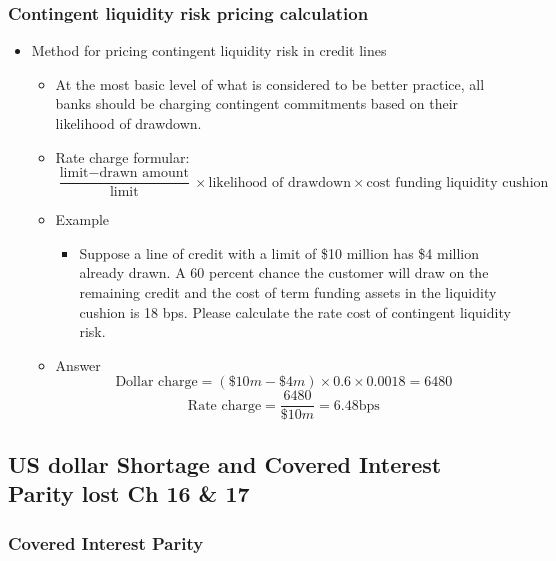 \subsubsection{Contingent liquidity risk pricing calculation}
\begin{itemize}
\item Method for pricing contingent liquidity risk in credit lines
    \begin{itemize}
    \item At the most basic level of what is considered to be better practice, all banks should be charging contingent commitments based on their likelihood of drawdown.
    \item Rate charge formular:
    \[
\frac{\text{limit} - \text{drawn amount}}{\text{limit}} \times \text{likelihood of drawdown} \times \text{cost funding liquidity cushion}
\]

    \item Example
        \begin{itemize}
        \item Suppose a line of credit with a limit of \$10 million has \$4 million already drawn. A 60 percent chance the customer will draw on the remaining credit and the cost of term funding assets in the liquidity cushion is 18 bps. Please calculate the rate cost of contingent liquidity risk.
        \end{itemize}
    \item Answer
        \[
\text{Dollar charge} = (\$10m - \$4m) \times 0.6 \times 0.0018 = 6480
\]
\[
\text{Rate charge} = \frac{6480}{\$10m} = 6.48 \text{bps}
\]

    \end{itemize}
\end{itemize}







\subsection{US dollar Shortage and Covered Interest Parity lost Ch 16 \& 17}


\subsubsection{Covered Interest Parity}

